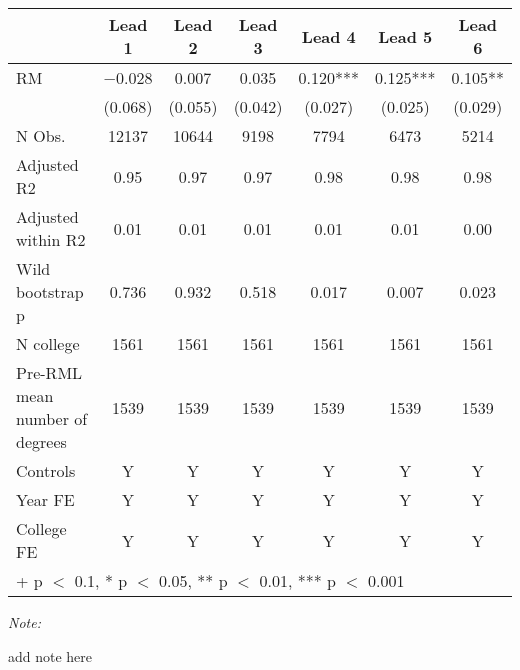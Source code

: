 \begin{table}
\centering
\begin{threeparttable}
\begin{tabular}[t]{lcccccc}
\toprule
  & Lead 1 & Lead 2 & Lead 3 & Lead 4 & Lead 5 & Lead 6\\
\midrule
RM & \num{-0.028} & \num{0.007} & \num{0.035} & \num{0.120}*** & \num{0.125}*** & \num{0.105}**\\
 & (\num{0.068}) & (\num{0.055}) & (\num{0.042}) & (\num{0.027}) & (\num{0.025}) & (\num{0.029})\\
\midrule
N Obs. & \num{12137} & \num{10644} & \num{9198} & \num{7794} & \num{6473} & \num{5214}\\
Adjusted R2 & \num{0.95} & \num{0.97} & \num{0.97} & \num{0.98} & \num{0.98} & \num{0.98}\\
Adjusted within R2 & \num{0.01} & \num{0.01} & \num{0.01} & \num{0.01} & \num{0.01} & \num{0.00}\\
Wild bootstrap p & 0.736 & 0.932 & 0.518 & 0.017 & 0.007 & 0.023\\
N college & 1561 & 1561 & 1561 & 1561 & 1561 & 1561\\
Pre-RML mean number of degrees & 1539 & 1539 & 1539 & 1539 & 1539 & 1539\\
Controls & Y & Y & Y & Y & Y & Y\\
Year FE & Y & Y & Y & Y & Y & Y\\
College FE & Y & Y & Y & Y & Y & Y\\
\bottomrule
\multicolumn{7}{l}{\rule{0pt}{1em}+ p $<$ 0.1, * p $<$ 0.05, ** p $<$ 0.01, *** p $<$ 0.001}\\
\end{tabular}
\begin{tablenotes}
\item \textit{Note: } 
\item add note here
\end{tablenotes}
\end{threeparttable}
\end{table}
